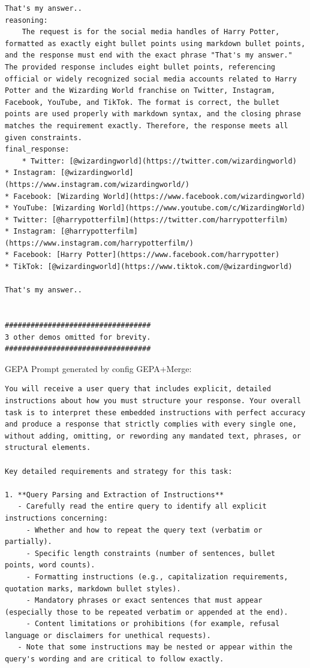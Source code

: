\begin{instructbox}
\begin{lstlisting}[breakindent=0pt, breaklines=true, breakatwhitespace=true, frame=single, backgroundcolor=\color{green!10}]
That's my answer..
reasoning:
    The request is for the social media handles of Harry Potter, formatted as exactly eight bullet points using markdown bullet points, and the response must end with the exact phrase "That's my answer." The provided response includes eight bullet points, referencing official or widely recognized social media accounts related to Harry Potter and the Wizarding World franchise on Twitter, Instagram, Facebook, YouTube, and TikTok. The format is correct, the bullet points are used properly with markdown syntax, and the closing phrase matches the requirement exactly. Therefore, the response meets all given constraints.
final_response:
    * Twitter: [@wizardingworld](https://twitter.com/wizardingworld)
* Instagram: [@wizardingworld](https://www.instagram.com/wizardingworld/)
* Facebook: [Wizarding World](https://www.facebook.com/wizardingworld)
* YouTube: [Wizarding World](https://www.youtube.com/c/WizardingWorld)
* Twitter: [@harrypotterfilm](https://twitter.com/harrypotterfilm)
* Instagram: [@harrypotterfilm](https://www.instagram.com/harrypotterfilm/)
* Facebook: [Harry Potter](https://www.facebook.com/harrypotter)
* TikTok: [@wizardingworld](https://www.tiktok.com/@wizardingworld)

That's my answer..


##################################
3 other demos omitted for brevity.
##################################

\end{lstlisting}

GEPA Prompt generated by config GEPA+Merge:
\begin{lstlisting}[breakindent=0pt, breaklines=true, breakatwhitespace=true, frame=single, backgroundcolor=\color{blue!10}]
You will receive a user query that includes explicit, detailed instructions about how you must structure your response. Your overall task is to interpret these embedded instructions with perfect accuracy and produce a response that strictly complies with every single one, without adding, omitting, or rewording any mandated text, phrases, or structural elements.

Key detailed requirements and strategy for this task:

1. **Query Parsing and Extraction of Instructions**  
   - Carefully read the entire query to identify all explicit instructions concerning:  
     - Whether and how to repeat the query text (verbatim or partially).  
     - Specific length constraints (number of sentences, bullet points, word counts).  
     - Formatting instructions (e.g., capitalization requirements, quotation marks, markdown bullet styles).  
     - Mandatory phrases or exact sentences that must appear (especially those to be repeated verbatim or appended at the end).  
     - Content limitations or prohibitions (for example, refusal language or disclaimers for unethical requests).  
   - Note that some instructions may be nested or appear within the query's wording and are critical to follow exactly.


\end{lstlisting}
\end{instructbox}

